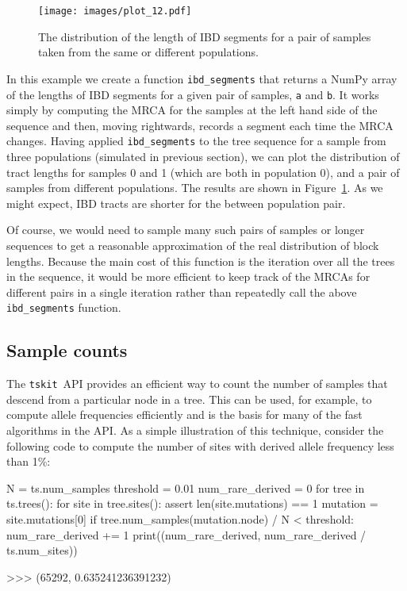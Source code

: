 \documentclass[graybox]{svmult}
\newcommand{\tskit}[0]{\texttt{tskit}}
\begin{document}
\begin{figure}
\begin{center}
\texttt{[image: images/plot\_12.pdf]}
\end{center}
\caption{\label{fig:ibd_segments} The distribution of the length of IBD
segments for a pair of samples taken from the same or different populations.}
\end{figure}

In this example we create a function \texttt{ibd\_segments} that returns
a NumPy array of the lengths of IBD segments for a given pair of
samples, \texttt{a} and \texttt{b}. It works simply by computing the
MRCA for the samples at the left hand side of the sequence and then,
moving rightwards, records a segment each time the MRCA changes. Having 
applied \texttt{ibd\_segments} to the tree sequence for a sample from three populations (simulated in previous section),
we can plot the distribution of tract lengths for samples 0 and 1 (which are
both in population 0), and a pair of
samples from different populations. The results are shown in
Figure~\ref{fig:ibd_segments}. As we might expect, IBD tracts
are shorter for the between population pair.

Of course, we would need to sample many such pairs of samples or longer sequences to
get a reasonable approximation of the real distribution of block lengths.
Because the main cost of this function is the iteration over all the
trees in the sequence, it would be more efficient to keep track of the MRCAs
for different pairs in a single iteration rather than repeatedly
call the above \texttt{ibd\_segments} function.

\subsection{Sample counts}\label{sample-counts}

The \tskit\ API provides an efficient way to count the number of samples that
descend from  a particular node in a tree. This can be used,
for example, to compute allele frequencies efficiently and is the basis
for many of the fast algorithms in the API. As a simple illustration of
this technique, consider the following code to compute the number of
sites with derived allele frequency less than 1\%:

\begin{pythoncode}
N = ts.num_samples
threshold = 0.01
num_rare_derived = 0
for tree in ts.trees():
    for site in tree.sites():
        assert len(site.mutations) == 1
        mutation = site.mutations[0]
        if tree.num_samples(mutation.node) / N < threshold:
            num_rare_derived += 1
print((num_rare_derived, num_rare_derived / ts.num_sites))

>>> (65292, 0.635241236391232)
\end{pythoncode}
\end{document}

